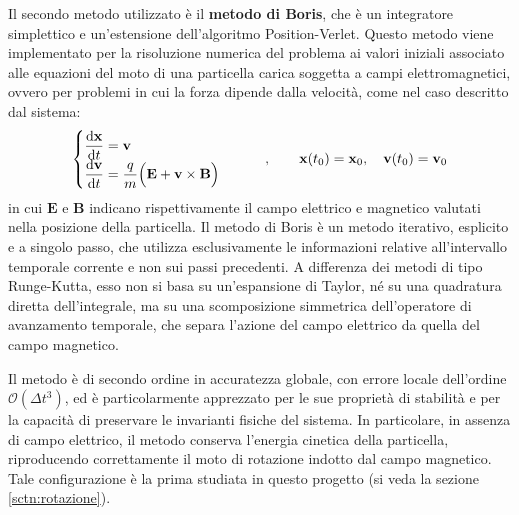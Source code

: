 \documentclass[10pt,a4paper]{article}
\begin{document}
Il secondo metodo utilizzato è il \textbf{metodo di Boris}, che è un integratore simplettico e un'estensione dell'algoritmo Position-Verlet. Questo metodo viene implementato per la risoluzione numerica del problema ai valori iniziali associato alle equazioni del moto di una particella carica soggetta a campi elettromagnetici, ovvero per problemi in cui la forza dipende dalla velocità, come nel caso descritto dal sistema:
\begin{equation}
    \begin{cases}
        \displaystyle \dv{\mathbf{x}}{t} = \mathbf{v} \\
        \displaystyle \dv{\mathbf{v}}{t} = \frac{q}{m} \Big( \mathbf{E} + \mathbf{v} \times \mathbf{B} \Big)
    \end{cases}
    \qquad , \qquad
    \mathbf{x}(t_0)=\mathbf{x}_0,\quad \mathbf{v}(t_0)=\mathbf{v}_0
\end{equation}
in cui $\mathbf{E}$ e $\mathbf{B}$ indicano rispettivamente il campo elettrico e magnetico valutati nella posizione della particella. Il metodo di Boris è un metodo iterativo, esplicito e a singolo passo, che utilizza esclusivamente le informazioni relative all'intervallo temporale corrente e non sui passi precedenti. A differenza dei metodi di tipo Runge-Kutta, esso non si basa su un'espansione di Taylor, né su una quadratura diretta dell'integrale, ma su una scomposizione simmetrica dell'operatore di avanzamento temporale, che separa l'azione del campo elettrico da quella del campo magnetico.

Il metodo è di secondo ordine in accuratezza globale, con errore locale dell'ordine $\mathcal{O}(\Delta t^3)$, ed è particolarmente apprezzato per le sue proprietà di stabilità e per la capacità di preservare le invarianti fisiche del sistema. In particolare, in assenza di campo elettrico, il metodo conserva l'energia cinetica della particella, riproducendo correttamente il moto di rotazione indotto dal campo magnetico. Tale configurazione è la prima studiata in questo progetto (si veda la sezione \ref{sctn:rotazione}).
\end{document}

